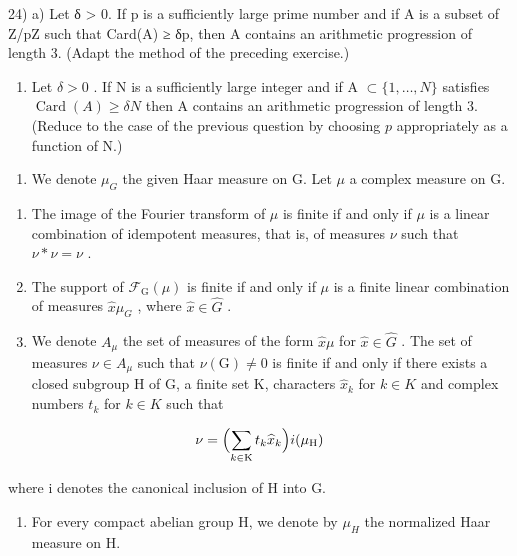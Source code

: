 24) a) Let δ \textgreater{} 0. If p is a sufficiently large prime number and if A is a subset of Z/pZ such that Card(A) ≥ δp, then A contains an arithmetic progression of length 3. (Adapt the method of the preceding exercise.)

\begin{enumerate}
\def\labelenumi{\alph{enumi})}
\setcounter{enumi}{1}
\tightlist
\item
  Let \(\delta > 0\) . If N is a sufficiently large integer and if A \(\subset \{1, \ldots, N\}\) satisfies \(\operatorname{Card}(A) \geqslant \delta N\) then A contains an arithmetic progression of length 3. (Reduce to the case of the previous question by choosing \(p\) appropriately as a function of N.)
\end{enumerate}

\begin{enumerate}
\def\labelenumi{\arabic{enumi})}
\setcounter{enumi}{24}
\tightlist
\item
  We denote \(\mu_{G}\) the given Haar measure on G. Let \(\mu\) a complex measure on G.
\end{enumerate}

\begin{enumerate}
\def\labelenumi{\alph{enumi})}
\item
  The image of the Fourier transform of \(\mu\) is finite if and only if \(\mu\) is a linear combination of idempotent measures, that is, of measures \(\nu\) such that \(\nu * \nu = \nu\) .
\item
  The support of \(\mathcal{F}_{\mathrm{G}}(\mu)\) is finite if and only if \(\mu\) is a finite linear combination of measures \(\widehat{x}\mu_{G}\) , where \(\widehat{x} \in \widehat{G}\) .
\item
  We denote \(A_{\mu}\) the set of measures of the form \(\widehat{x}\mu\) for \(\widehat{x}\in\widehat{G}\) . The set of measures \(\nu\in A_{\mu}\) such that \(\nu(\mathrm{G})\neq0\) is finite if and only if there exists a closed subgroup H of G, a finite set K, characters \(\widehat{x}_{k}\) for \(k\in K\) and complex numbers \(t_{k}\) for \(k\in K\) such that
\end{enumerate}

\[
\nu = \Bigl (\sum_ {k \in \mathrm{K}} t _ {k} \widehat {x} _ {k} \Bigr) i (\mu_ {\mathrm{H}})
\]

where i denotes the canonical inclusion of H into G.

\begin{enumerate}
\def\labelenumi{\arabic{enumi})}
\setcounter{enumi}{25}
\tightlist
\item
  For every compact abelian group H, we denote by \(\mu_{H}\) the normalized Haar measure on H.
\end{enumerate}


